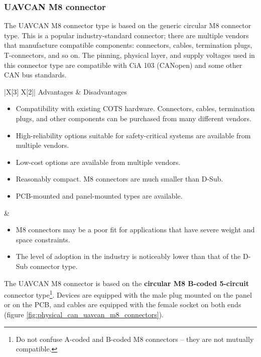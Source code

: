 \clearpage  %
\subsubsection{UAVCAN M8 connector}

The UAVCAN M8 connector type is based on the generic circular M8 connector type.
This is a popular industry-standard connector; there are multiple vendors that manufacture compatible components:
connectors, cables, termination plugs, T-connectors, and so on.
The pinning, physical layer, and supply voltages used in this connector type are compatible with CiA 103 (CANopen)
and some other CAN bus standards.

{
\NoLeftSkip
\begin{UAVCANCompactTable}{|X[3] X[2]|}
    Advantages & Disadvantages \\
    \begin{itemize}
        \item Compatibility with existing COTS hardware.
        Connectors, cables, termination plugs, and other components can be purchased from many different vendors.
        \item High-reliability options suitable for safety-critical systems are available from multiple vendors.
        \item Low-cost options are available from multiple vendors.
        \item Reasonably compact. M8 connectors are much smaller than D-Sub.
        \item PCB-mounted and panel-mounted types are available.
    \end{itemize}
    &
    \begin{itemize}
        \item M8 connectors may be a poor fit for applications that have severe weight and space constraints.
        \item The level of adoption in the industry is noticeably lower than that of the D-Sub connector type.
    \end{itemize}
\end{UAVCANCompactTable}
}

The UAVCAN M8 connector is based on the \textbf{circular M8 B-coded 5-circuit} connector type\footnote{%
    Do not confuse A-coded and B-coded M8 connectors -- they are not mutually compatible.
}.
Devices are equipped with the male plug mounted on the panel or on the PCB,
and cables are equipped with the female socket on both ends (figure \ref{fig:physical_can_uavcan_m8_connectors}).

